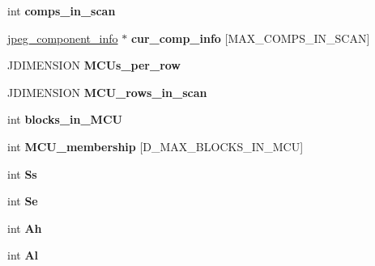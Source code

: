\begin{DoxyCompactItemize}
int {\bfseries comps\+\_\+in\+\_\+scan}
\item 
\mbox{\label{structjpeg__decompress__struct_ab640afe8fb70108caed0c2520aab0c2a}} 
\hyperlink{structjpeg__component__info}{jpeg\+\_\+component\+\_\+info} $\ast$ {\bfseries cur\+\_\+comp\+\_\+info} \mbox{[}M\+A\+X\+\_\+\+C\+O\+M\+P\+S\+\_\+\+I\+N\+\_\+\+S\+C\+AN\mbox{]}
\item 
\mbox{\label{structjpeg__decompress__struct_aafebfaa0046cc8b449ce2401c174697f}} 
J\+D\+I\+M\+E\+N\+S\+I\+ON {\bfseries M\+C\+Us\+\_\+per\+\_\+row}
\item 
\mbox{\label{structjpeg__decompress__struct_a6d1110064a4f2fbc46a8831fd148bca6}} 
J\+D\+I\+M\+E\+N\+S\+I\+ON {\bfseries M\+C\+U\+\_\+rows\+\_\+in\+\_\+scan}
\item 
\mbox{\label{structjpeg__decompress__struct_a76d2872b589796cb8d66428e660e37fb}} 
int {\bfseries blocks\+\_\+in\+\_\+\+M\+CU}
\item 
\mbox{\label{structjpeg__decompress__struct_abcd46ef2fd7c068bdbdcde43efbd786e}} 
int {\bfseries M\+C\+U\+\_\+membership} \mbox{[}D\+\_\+\+M\+A\+X\+\_\+\+B\+L\+O\+C\+K\+S\+\_\+\+I\+N\+\_\+\+M\+CU\mbox{]}
\item 
\mbox{\label{structjpeg__decompress__struct_a61133b3e8959b3ab4ead2b6e12761176}} 
int {\bfseries Ss}
\item 
\mbox{\label{structjpeg__decompress__struct_a978242a8eb6c75dbb86e8382470b2290}} 
int {\bfseries Se}
\item 
\mbox{\label{structjpeg__decompress__struct_a2df559c55319d0c785b91e95960bea55}} 
int {\bfseries Ah}
\item 
\mbox{\label{structjpeg__decompress__struct_a1dfbdcc8449dbc329a352a75d4046154}} 
int {\bfseries Al}
\item 
\mbox{\label{structjpeg__decompress__struct_a18f5caeead3dbaf5dfebf7aa08e3ee3f}} 

\end{DoxyCompactItemize}
